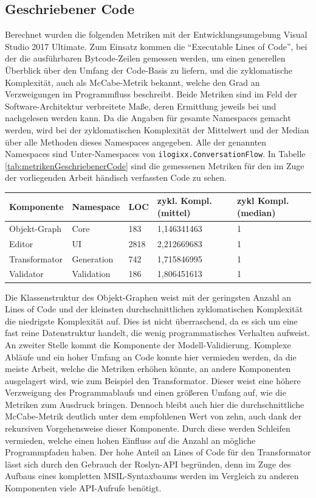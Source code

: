\subsection{Geschriebener Code}
Berechnet wurden die folgenden Metriken mit der Entwicklungsumgebung Visual Studio 2017 Ultimate. Zum Einsatz kommen die ``Executable Lines of Code'', bei der die ausführbaren Bytcode-Zeilen gemessen werden, um einen generellen Überblick über den Umfang der Code-Basis zu liefern, und die zyklomatische Komplexität, auch als McCabe-Metrik bekannt, welche den Grad an Verzweigungen im Programmfluss beschreibt. Beide Metriken sind im Feld der Software-Architektur verbreitete Maße, deren Ermittlung jeweils bei \cite[S. 35ff]{Laird:06} und \cite[S. 58ff]{Laird:06} nachgelesen werden kann. Da die Angaben für gesamte Namespaces gemacht werden, wird bei der zyklomatischen Komplexität der Mittelwert und der Median über alle Methoden dieses Namespaces angegeben. Alle der genannten Namespaces sind Unter-Namespaces von \texttt{ilogixx.ConversationFlow}. In Tabelle \ref{tab:metrikenGeschriebenerCode} sind die gemessenen Metriken für den im Zuge der vorliegenden Arbeit händisch verfassten Code zu sehen.
\begin{center}
    \begin{tabular}{| p{} | p{} | p{} | p{} | p{} |}
    \hline
    Komponente & Namespace & LOC & zykl. Kompl. (mittel) & zykl Kompl. (median)\\ \hline
    Objekt-Graph & Core & 183 & 1,146341463 & 1 \\ \hline
    Editor & UI & 2818 & 2,212669683 & 1 \\ \hline
    Transformator & Generation & 742 & 1,715846995 & 1 \\ \hline
    Validator & Validation & 186 & 1,806451613 & 1 \\ \hline
    \end{tabular}
    \label{tab:metrikenGeschriebenerCode}
\end{center}
Die Klassenstruktur des Objekt-Graphen weist mit der geringsten Anzahl an Lines of Code und der kleinsten durchschnittlichen zyklomatischen Komplexität die niedrigste Komplexität auf. Dies ist nicht überraschend, da es sich um eine fast reine Datenstruktur handelt, die wenig programmatisches Verhalten aufweist. An zweiter Stelle kommt die Komponente der Modell-Validierung. Komplexe Abläufe und ein hoher Umfang an Code konnte hier vermieden werden, da die meiste Arbeit, welche die Metriken erhöhen könnte, an andere Komponenten ausgelagert wird, wie zum Beispiel den Transformator. Dieser weist eine höhere Verzweigung des Programmablaufs und einen größeren Umfang auf, wie die Metriken zum Ausdruck bringen. Dennoch bleibt auch hier die durchschnittliche McCabe-Metrik deutlich unter dem empfohlenen Wert von zehn, auch dank der rekursiven Vorgehensweise dieser Komponente. Durch diese werden Schleifen vermieden, welche einen hohen Einfluss auf die Anzahl an mögliche Programmpfaden haben. Der hohe Anteil an Lines of Code für den Transformator lässt sich durch den Gebrauch der Roslyn-API begründen, denn im Zuge des Aufbaus eines kompletten MSIL-Syntaxbaums werden im Vergleich zu anderen Komponenten  viele API-Aufrufe benötigt. 
